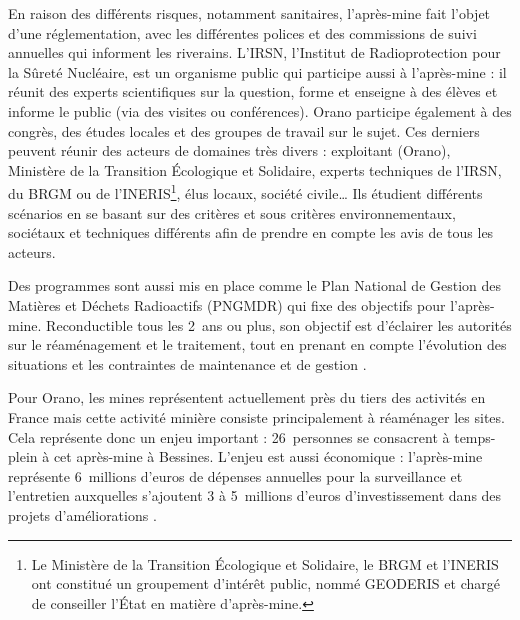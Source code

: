 \documentclass{article}
\begin{document}
En raison des différents risques, notamment sanitaires, l’après-mine fait l’objet d’une réglementation, avec les différentes polices et des commissions de suivi annuelles qui informent les riverains.
L’IRSN, l’Institut de Radioprotection pour la Sûreté Nucléaire, est un organisme public qui participe aussi à l’après-mine : il réunit des experts scientifiques sur la question, forme et enseigne à des élèves et informe le public (via des visites ou conférences). Orano participe également à des congrès, des études locales et des groupes de travail sur le sujet. Ces derniers peuvent réunir des acteurs de domaines très divers : exploitant (Orano), Ministère de la Transition Écologique et Solidaire, experts techniques de l’IRSN, du BRGM ou de l'INERIS\footnote{Le Ministère de la Transition Écologique et Solidaire, le BRGM et l'INERIS ont constitué un groupement d'intérêt public, nommé GEODERIS et chargé de conseiller l'État en matière d'après-mine.}, élus locaux, société civile… Ils étudient différents scénarios en se basant sur des critères et sous critères environnementaux, sociétaux et techniques différents afin de prendre en compte les avis de tous les acteurs.

Des programmes sont aussi mis en place comme le Plan National de Gestion des Matières et Déchets Radioactifs (PNGMDR) qui fixe des objectifs pour l’après-mine. Reconductible tous les 2~ans ou plus, son objectif est d’éclairer les autorités sur le réaménagement et le traitement, tout en prenant en compte l’évolution des situations et les contraintes de maintenance et de gestion \cite{dublineau_gestion_2020}.

Pour Orano, les mines représentent actuellement près du tiers des activités en France mais cette activité minière consiste principalement à réaménager les sites. Cela représente donc un enjeu important : 26~personnes se consacrent à temps-plein à cet après-mine à Bessines. L'enjeu est aussi économique : l’après-mine représente 6~millions d’euros de dépenses annuelles pour la surveillance et l’entretien auxquelles s’ajoutent 3 à 5~millions d’euros d’investissement dans des projets d’améliorations \cite{himeur_apres-mine_2020}. 
\end{document}
